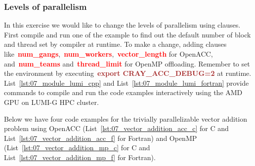 \subsubsection{Levels of parallelism}


\par
In this exercise we would like to change the levels of parallelism using clauses.
First compile and run one of the example to find out the default number of block and thread set by compiler at runtime.
To make a change, adding clauses like~\textbf{\textcolor{red}{num\_gangs}},~\textbf{\textcolor{red}{num\_workers}},~\textbf{\textcolor{red}{vector\_length}} for OpenACC, and~\textbf{\textcolor{red}{num\_teams}} and~\textbf{\textcolor{red}{thread\_limit}} for OpenMP offloading.
Remember to set the environment by executing~\textbf{\textcolor{brown}{export CRAY\_ACC\_DEBUG=2}} at runtime.
List~\ref{lst:07_module_lumi_cpp} and List~\ref{lst:07_module_lumi_fortran} provide commands to compile and run the code examples interactively using the AMD GPU on LUMI-G HPC cluster.








\par
Below we have four code examples for the trivially parallelizable vector addition problem using OpenACC (List~\ref{lst:07_vector_addition_acc_c} for C and List~\ref{lst:07_vector_addition_acc_f} for Fortran) and OpenMP (List~\ref{lst:07_vector_addition_mp_c} for C and List~\ref{lst:07_vector_addition_mp_f} for Fortran).








